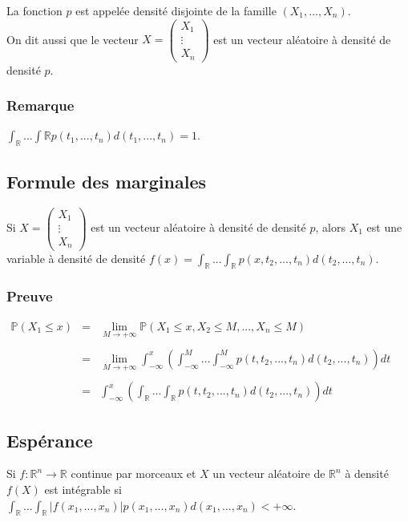 \documentclass[a4paper,10pt]{book} %
\newcommand{\R}{\mathbb{R}}
\renewcommand{\P}{\mathbb{P}} %
\newcommand\abs[1]{\left|#1\right|}
\begin{document}
La fonction $p$ est appelée densité disjointe de la famille $(X_1,...,X_n)$.\\

On dit aussi que le vecteur $X = \begin{pmatrix}X_1 \\ \vdots \\ X_n\end{pmatrix}$ est un vecteur aléatoire à densité de densité $p$.

\subsubsection{Remarque}
$\displaystyle \int_\R ... \int\R p(t_1,...,t_n)d(t_1,...,t_n) = 1$.

\newpage

\subsection{Formule des marginales}
Si $X=\begin{pmatrix}
X_1\\\vdots\\X_n
\end{pmatrix}$ est un vecteur aléatoire à densité de densité $p$, alors $X_1$ est une variable à densité de densité $\displaystyle f(x) = \int_\R ... \int_\R p(x,t_2,...,t_n)d(t_2,...,t_n)$.

\subsubsection{Preuve}
$\begin{array}{rcl}\displaystyle \P(X_1\leq x) &=&\displaystyle  \lim\limits_{M\rightarrow +\infty} \P(X_1\leq x, X_2\leq M, ..., X_n\leq M)\\\\
&=& \displaystyle \lim\limits_{M\rightarrow +\infty} \int_{-\infty}^x (\int_{-\infty}^M... \int_{-\infty}^M p(t,t_2,...,t_n)d(t_2,...,t_n) )dt\\\\
&=& \displaystyle \int_{-\infty}^x(\int_\R ... \int_\R p(t, t_2, ..., t_n)d(t_2,...,t_n))dt\end{array}$

\subsection{Espérance}
Si $f: \R^n \rightarrow \R$ continue par morceaux et $X$ un vecteur aléatoire de $\R^n$ à densité $f(X)$ est intégrable si $\displaystyle \int_\R ... \int_\R \abs{f(x_1,...,x_n)}p(x_1,...,x_n)d(x_1,...,x_n) < +\infty$.\\
\end{document}
